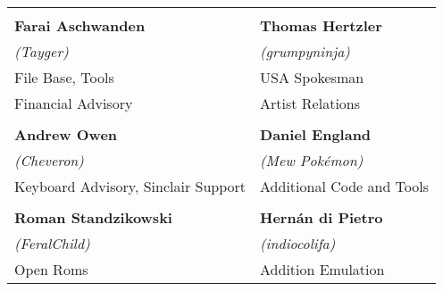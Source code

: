 \begin{tabular}{ll}
& \\
{\large\bf Farai Aschwanden}            & {\large\bf Thomas Hertzler} \\
 \textit{(Tayger)}                      & \textit{(grumpyninja)} \\
File Base, Tools                        & USA Spokesman \\
Financial Advisory                      & Artist Relations \\
& \\
{\large\bf Andrew Owen}                 & {\large\bf Daniel England} \\
 \textit{(Cheveron)}                    & \textit{(Mew Pokémon)} \\
Keyboard Advisory, Sinclair Support     & Additional Code and Tools \\
& \\
{\large\bf Roman Standzikowski}         & {\large\bf Hernán di Pietro} \\
 \textit{(FeralChild)}                  & \textit{(indiocolifa)} \\
Open Roms                               & Addition Emulation \\
\end{tabular}


